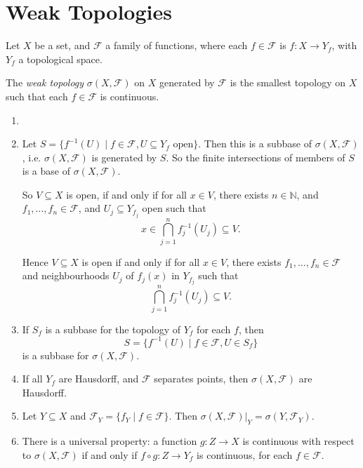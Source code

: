 \documentclass[12pt]{article}
\begin{document}
\newpage

\section{Weak Topologies}%
\label{sec:weak}

Let $X$ be a set, and $\mathcal{F}$ a family of functions, where each $f \in \mathcal{F}$ is $f : X \to Y_f$, with $Y_f$ a topological space.

The \emph{weak topology} $\sigma(X, \mathcal{F})$ on $X$ generated by $\mathcal{F}$ is the smallest topology on $X$ such that each $f \in \mathcal{F}$ is continuous.

\begin{remark}
	\begin{enumerate}
		\item[]
		\item Let $S = \{f^{-1}(U) \mid f \in \mathcal{F}, U \subseteq Y_f \text{ open}\}$. Then this is a subbase of $\sigma(X, \mathcal{F})$, i.e. $\sigma(X, \mathcal{F})$ is generated by $S$. So the finite intersections of members of $S$ is a base of $\sigma(X, \mathcal{F})$.

			So $V \subseteq X$ is open, if and only if for all $x \in V$, there exists $n \in \mathbb{N}$, and $f_1, \ldots, f_n \in \mathcal{F}$, and $U_j \subseteq Y_{f_j}$ open such that
			\[
			x \in \bigcap _{j = 1}^n f_j^{-1}(U_j) \subseteq V.
			\]

			Hence $V \subseteq X$ is open if and only if for all $x \in V$, there exists $f_1, \ldots, f_n \in \mathcal{F}$ and neighbourhoods $U_j$ of $f_j(x)$ in $Y_{f_j}$ such that
			\[
			\bigcap_{j = 1}^n f_j^{-1}(U_j) \subseteq V.
			\]
		\item If $S_f$ is a subbase for the topology of $Y_f$ for each $f$, then
			\[
				S = \{f^{-1}(U) \mid f \in \mathcal{F}, U \in S_f\}
			\]
			is a subbase for $\sigma(X, \mathcal{F})$.
		\item If all $Y_f$ are Hausdorff, and $\mathcal{F}$ separates points, then $\sigma(X, \mathcal{F})$ are Hausdorff.
		\item Let $Y \subseteq X$ and $\mathcal{F}_Y = \{f_Y \mid f \in \mathcal{F}\}$. Then $\sigma(X, \mathcal{F})|_Y = \sigma(Y, \mathcal{F}_Y)$.
		\item There is a universal property: a function $g : Z \to X$ is continuous with respect to $\sigma(X, \mathcal{F})$ if and only if $f \circ g : Z \to Y_f$ is continuous, for each $f \in \mathcal{F}$.
	\end{enumerate}
\end{remark}
\end{document}
